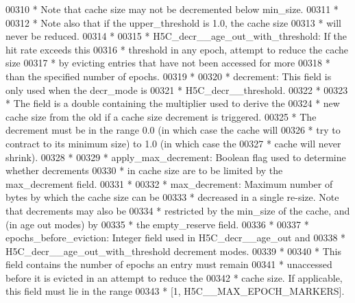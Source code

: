 \begin{DoxyCode}
00310 \textcolor{comment}{ *              Note that cache size may not be decremented below min\_size.}
00311 \textcolor{comment}{ *}
00312 \textcolor{comment}{ *              Note also that if the upper\_threshold is 1.0, the cache size}
00313 \textcolor{comment}{ *              will never be reduced.}
00314 \textcolor{comment}{ *}
00315 \textcolor{comment}{ *      H5C\_decr\_\_age\_out\_with\_threshold:  If the hit rate exceeds this}
00316 \textcolor{comment}{ *              threshold in any epoch, attempt to reduce the cache size}
00317 \textcolor{comment}{ *              by evicting entries that have not been accessed for more}
00318 \textcolor{comment}{ *              than the specified number of epochs.}
00319 \textcolor{comment}{ *}
00320 \textcolor{comment}{ * decrement: This field is only used when the decr\_mode is}
00321 \textcolor{comment}{ *      H5C\_decr\_\_threshold.}
00322 \textcolor{comment}{ *}
00323 \textcolor{comment}{ *      The field is a double containing the multiplier used to derive the}
00324 \textcolor{comment}{ *      new cache size from the old if a cache size decrement is triggered.}
00325 \textcolor{comment}{ *      The decrement must be in the range 0.0 (in which case the cache will}
00326 \textcolor{comment}{ *      try to contract to its minimum size) to 1.0 (in which case the}
00327 \textcolor{comment}{ *      cache will never shrink).}
00328 \textcolor{comment}{ *}
00329 \textcolor{comment}{ * apply\_max\_decrement:  Boolean flag used to determine whether decrements}
00330 \textcolor{comment}{ *      in cache size are to be limited by the max\_decrement field.}
00331 \textcolor{comment}{ *}
00332 \textcolor{comment}{ * max\_decrement: Maximum number of bytes by which the cache size can be}
00333 \textcolor{comment}{ *      decreased in a single re-size.  Note that decrements may also be}
00334 \textcolor{comment}{ *      restricted by the min\_size of the cache, and (in age out modes) by}
00335 \textcolor{comment}{ *      the empty\_reserve field.}
00336 \textcolor{comment}{ *}
00337 \textcolor{comment}{ * epochs\_before\_eviction:  Integer field used in H5C\_decr\_\_age\_out and}
00338 \textcolor{comment}{ *      H5C\_decr\_\_age\_out\_with\_threshold decrement modes.}
00339 \textcolor{comment}{ *}
00340 \textcolor{comment}{ *      This field contains the number of epochs an entry must remain}
00341 \textcolor{comment}{ *      unaccessed before it is evicted in an attempt to reduce the}
00342 \textcolor{comment}{ *      cache size.  If applicable, this field must lie in the range}
00343 \textcolor{comment}{ *      [1, H5C\_\_MAX\_EPOCH\_MARKERS].}

\end{DoxyCode}
